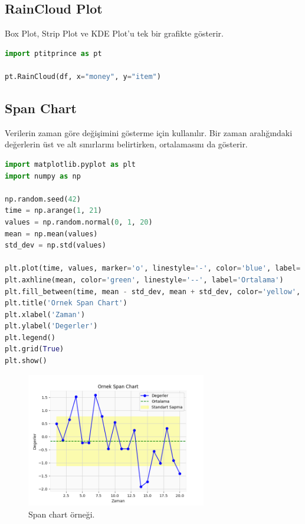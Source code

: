 \newpage

\subsection{RainCloud Plot}
Box Plot, Strip Plot ve KDE Plot'u tek bir grafikte gösterir.

\begin{lstlisting}[language=Python]
import ptitprince as pt

pt.RainCloud(df, x="money", y="item")
\end{lstlisting}

\newpage

\subsection{Span Chart}
Verilerin zaman göre değişimini gösterme için kullanılır. Bir zaman aralığındaki değerlerin üst ve alt sınırlarını belirtirken, ortalamasını da gösterir.

\begin{lstlisting}[language=Python]
import matplotlib.pyplot as plt
import numpy as np

np.random.seed(42)
time = np.arange(1, 21)
values = np.random.normal(0, 1, 20)
mean = np.mean(values)
std_dev = np.std(values)

plt.plot(time, values, marker='o', linestyle='-', color='blue', label='Degerler')
plt.axhline(mean, color='green', linestyle='--', label='Ortalama')
plt.fill_between(time, mean - std_dev, mean + std_dev, color='yellow', alpha=0.3, label='Standart Sapma')
plt.title('Ornek Span Chart')
plt.xlabel('Zaman')
plt.ylabel('Degerler')
plt.legend()
plt.grid(True)
plt.show()
\end{lstlisting}

\begin{figure}[h]
    \centering
    \includegraphics[width=0.7\textwidth]{images/span_chart.png}
    \caption{Span chart örneği.}
    \label{fig:enter-label}
\end{figure}

